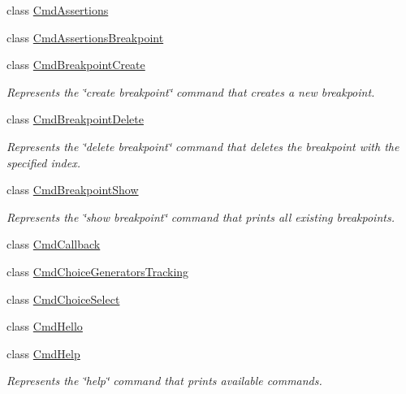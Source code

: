 \begin{DoxyCompactItemize}
\item 
class \hyperlink{classgov_1_1nasa_1_1jpf_1_1inspector_1_1client_1_1commands_1_1_cmd_assertions}{Cmd\+Assertions}
\item 
class \hyperlink{classgov_1_1nasa_1_1jpf_1_1inspector_1_1client_1_1commands_1_1_cmd_assertions_breakpoint}{Cmd\+Assertions\+Breakpoint}
\item 
class \hyperlink{classgov_1_1nasa_1_1jpf_1_1inspector_1_1client_1_1commands_1_1_cmd_breakpoint_create}{Cmd\+Breakpoint\+Create}
\begin{DoxyCompactList}\small\item\em Represents the \char`\"{}create breakpoint\char`\"{} command that creates a new breakpoint. \end{DoxyCompactList}\item 
class \hyperlink{classgov_1_1nasa_1_1jpf_1_1inspector_1_1client_1_1commands_1_1_cmd_breakpoint_delete}{Cmd\+Breakpoint\+Delete}
\begin{DoxyCompactList}\small\item\em Represents the \char`\"{}delete breakpoint\char`\"{} command that deletes the breakpoint with the specified index. \end{DoxyCompactList}\item 
class \hyperlink{classgov_1_1nasa_1_1jpf_1_1inspector_1_1client_1_1commands_1_1_cmd_breakpoint_show}{Cmd\+Breakpoint\+Show}
\begin{DoxyCompactList}\small\item\em Represents the \char`\"{}show breakpoint\char`\"{} command that prints all existing breakpoints. \end{DoxyCompactList}\item 
class \hyperlink{classgov_1_1nasa_1_1jpf_1_1inspector_1_1client_1_1commands_1_1_cmd_callback}{Cmd\+Callback}
\item 
class \hyperlink{classgov_1_1nasa_1_1jpf_1_1inspector_1_1client_1_1commands_1_1_cmd_choice_generators_tracking}{Cmd\+Choice\+Generators\+Tracking}
\item 
class \hyperlink{classgov_1_1nasa_1_1jpf_1_1inspector_1_1client_1_1commands_1_1_cmd_choice_select}{Cmd\+Choice\+Select}
\item 
class \hyperlink{classgov_1_1nasa_1_1jpf_1_1inspector_1_1client_1_1commands_1_1_cmd_hello}{Cmd\+Hello}
\item 
class \hyperlink{classgov_1_1nasa_1_1jpf_1_1inspector_1_1client_1_1commands_1_1_cmd_help}{Cmd\+Help}
\begin{DoxyCompactList}\small\item\em Represents the \char`\"{}help\char`\"{} command that prints available commands. \end{DoxyCompactList}\item 

\end{DoxyCompactItemize}
